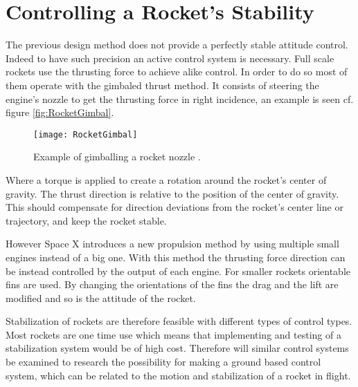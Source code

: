 \section{Controlling a Rocket's Stability}
The previous design method does not provide a perfectly stable attitude control. Indeed to have such precision an active control system is necessary. Full scale rockets use the thrusting force to achieve alike control. In order to do so most of them operate with the gimbaled thrust method. It consists of steering the engine's nozzle to get the thrusting force in right incidence, an example is seen cf. figure \autoref{fig:RocketGimbal}. 
\begin{figure} [htbp]
	\centering
	\texttt{[image: RocketGimbal]}
	\caption{Example of gimballing a rocket nozzle \cite{web:rocketnasa}.}
	\label{fig:RocketGimbal}
\end{figure}

Where a torque is applied to create a rotation around the rocket's center of gravity. The thrust direction is relative to the position of the center of gravity.  This should compensate for direction deviations from the rocket's center line or trajectory, and keep the rocket stable.    	

However Space X introduces a new propulsion method by using multiple small engines instead of a big one. With this method the thrusting force direction can be instead controlled by the output of each engine. For smaller rockets orientable fins are used. By changing the orientations of the fins the drag and the lift are modified and so is the attitude of the rocket.


Stabilization of rockets are therefore feasible with different types of control types. Most rockets are one time use which means that implementing and testing of a stabilization system would be of high cost. Therefore will similar control systems be examined to research the possibility for making a ground based control system, which can be related to the motion and stabilization of a rocket in flight. 